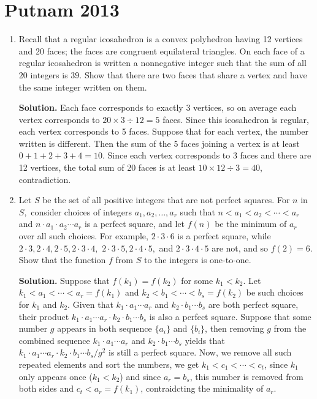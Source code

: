 \documentclass[11pt,a4paper]{article}
\newcommand{\<}{\langle}
\renewcommand{\>}{\rangle}
\begin{document}
\newcommand{\sgn}{\text{sgn}}
\setcounter{secnumdepth}{0}

\section{Putnam 2013}
\begin{enumerate}
	\item [\textbf{A1}] Recall that a regular icosahedron is a convex polyhedron having 12 vertices and 20 faces; the faces are congruent equilateral triangles. On each face of a regular icosahedron is written a nonnegative integer such that the sum of all $20$ integers is $39.$ Show that there are two faces that share a vertex and have the same integer written on them.
	
	\textbf{Solution.} Each face corresponds to exactly 3 vertices, so on average each vertex corresponds to $20\times 3\div 12=5$ faces. Since this icosahedron is regular, each vertex corresponds to 5 faces. Suppose that for each vertex, the number written is different. Then the sum of the 5 faces joining a vertex is at least $0+1+2+3+4=10$. Since each vertex corresponds to 3 faces and there are 12 vertices, the total sum of 20 faces is at least $10\times 12\div 3=40$, contradiction. 
	
	\item[\textbf{A2}]Let $S$ be the set of all positive integers that are not perfect squares. For $n$ in $S,$ consider choices of integers $a_1,a_2,\dots, a_r$ such that $n<a_1<a_2<\cdots<a_r$ and $n\cdot a_1\cdot a_2\cdots a_r$ is a perfect square, and let $f(n)$ be the minimum of $a_r$ over all such choices. For example, $2\cdot 3\cdot 6$ is a perfect square, while $2\cdot 3,2\cdot 4, 2\cdot 5, 2\cdot 3\cdot 4,$ $2\cdot 3\cdot 5, 2\cdot 4\cdot 5,$ and $2\cdot 3\cdot 4\cdot 5$ are not, and so $f(2)=6.$ Show that the function $f$ from $S$ to the integers is one-to-one.
	
	\textbf{Solution.} Suppose that $f(k_1)=f(k_2)$ for some $k_1 < k_2$. Let $k_1<a_1<\cdots <a_r=f(k_1)$ and $k_2<b_1<\cdots<b_s=f(k_2)$ be such choices for $k_1$ and $k_2$. Given that $k_1\cdot a_1\cdots a_r$ and $k_2\cdot b_1\cdots b_s$ are both perfect square, their product $k_1\cdot a_1\cdots a_r\cdot k_2\cdot b_1\cdots b_s$ is also a perfect square. Suppose that some number $g$ appears in both sequence $\{a_i\}$ and $\{b_i\}$, then removing $g$ from the combined sequence $k_1\cdot a_1\cdots a_r$ and $k_2\cdot b_1\cdots b_s$ yields that $k_1\cdot a_1\cdots a_r\cdot k_2\cdot b_1\cdots b_s/g^2$ is still a perfect square. Now, we remove all such repeated elements and sort the numbers, we get $k_1<c_1<\cdots <c_t$, since $k_1$ only appears once ($k_1<k_2$) and since $a_r=b_s$, this number is removed from both sides and $c_t<a_r=f(k_1)$, contraidcting the minimality of $a_r$. 
	

\end{enumerate}
\end{document}
